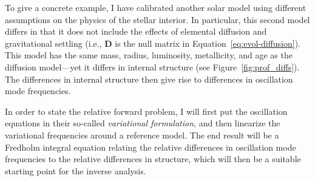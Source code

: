 To give a concrete example, I have calibrated another solar model using different assumptions on the physics of the stellar interior. 
In particular, this second model differs in that it does not include the effects of elemental diffusion and gravitational settling (i.e., $\mathbf{D}$ is the null matrix in Equation~\ref{eq:evol-diffusion}). 
This model has the same mass, radius, luminosity, metallicity, and age as the diffusion model---yet it differs in internal structure (see Figure~\ref{fig:prof_diffs}). %
The differences in internal structure then give rise to differences in oscillation mode frequencies. %

In order to state the relative forward problem, I will first put the oscillation equations in their so-called \emph{variational formulation}, and then %
linearize the variational frequencies around a reference model. 
The end result will be a Fredholm integral equation relating the relative differences in oscillation mode frequencies to the relative differences in structure, which will then be a suitable starting point for the inverse analysis. 


